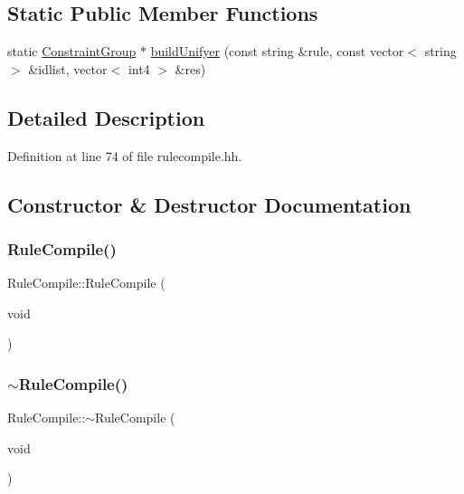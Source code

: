 \subsection*{Static Public Member Functions}
\begin{DoxyCompactItemize}
\item 
static \mbox{\hyperlink{class_constraint_group}{Constraint\+Group}} $\ast$ \mbox{\hyperlink{class_rule_compile_a01438d844a28a2e64afc725ce97d0b5b}{build\+Unifyer}} (const string \&rule, const vector$<$ string $>$ \&idlist, vector$<$ int4 $>$ \&res)
\end{DoxyCompactItemize}


\subsection{Detailed Description}


Definition at line 74 of file rulecompile.\+hh.



\subsection{Constructor \& Destructor Documentation}
\mbox{\label{class_rule_compile_a7e3f15cb6cdf4b3cd5a36e1e37447200}} 
\subsubsection{\texorpdfstring{RuleCompile()}{RuleCompile()}}
{\footnotesize\ttfamily Rule\+Compile\+::\+Rule\+Compile (\begin{DoxyParamCaption}\item[{void}]{ }\end{DoxyParamCaption})}

\mbox{\label{class_rule_compile_a65af0c854d587caf4db20bf38bad8b36}} 
\subsubsection{\texorpdfstring{$\sim$RuleCompile()}{~RuleCompile()}}
{\footnotesize\ttfamily Rule\+Compile\+::$\sim$\+Rule\+Compile (\begin{DoxyParamCaption}\item[{void}]{ }\end{DoxyParamCaption})}



